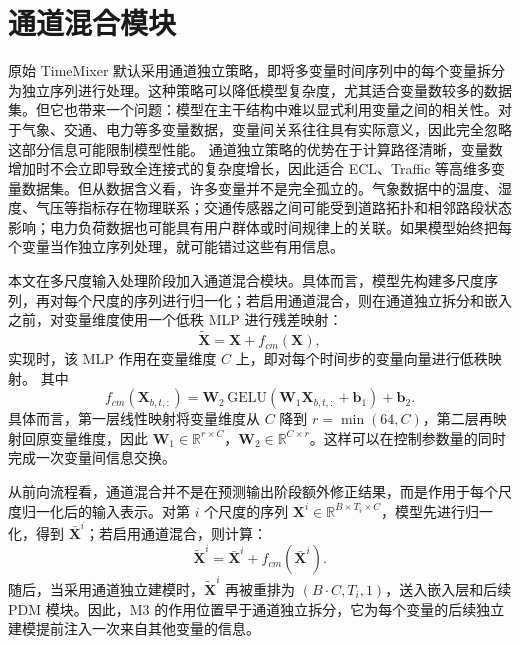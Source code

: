 \section{通道混合模块}

原始 TimeMixer 默认采用通道独立策略，即将多变量时间序列中的每个变量拆分为独立序列进行处理。这种策略可以降低模型复杂度，尤其适合变量数较多的数据集。但它也带来一个问题：模型在主干结构中难以显式利用变量之间的相关性。对于气象、交通、电力等多变量数据，变量间关系往往具有实际意义，因此完全忽略这部分信息可能限制模型性能。
通道独立策略的优势在于计算路径清晰，变量数增加时不会立即导致全连接式的复杂度增长，因此适合 ECL、Traffic 等高维多变量数据集。但从数据含义看，许多变量并不是完全孤立的。气象数据中的温度、湿度、气压等指标存在物理联系；交通传感器之间可能受到道路拓扑和相邻路段状态影响；电力负荷数据也可能具有用户群体或时间规律上的关联。如果模型始终把每个变量当作独立序列处理，就可能错过这些有用信息。

本文在多尺度输入处理阶段加入通道混合模块。具体而言，模型先构建多尺度序列，再对每个尺度的序列进行归一化；若启用通道混合，则在通道独立拆分和嵌入之前，对变量维度使用一个低秩 MLP 进行残差映射：
\begin{equation}
    \tilde{\mathbf{X}} = \mathbf{X} + f_{cm}(\mathbf{X}),
\end{equation}
实现时，该 MLP 作用在变量维度 $C$ 上，即对每个时间步的变量向量进行低秩映射。
其中
\begin{equation}
    f_{cm}(\mathbf{X}_{b,t,:}) = \mathbf{W}_2 \,\mathrm{GELU}(\mathbf{W}_1 \mathbf{X}_{b,t,:}+\mathbf{b}_1)+\mathbf{b}_2.
\end{equation}
具体而言，第一层线性映射将变量维度从 $C$ 降到 $r=\min(64,C)$，第二层再映射回原变量维度，因此 $\mathbf{W}_1\in\mathbb{R}^{r\times C}$，$\mathbf{W}_2\in\mathbb{R}^{C\times r}$。这样可以在控制参数量的同时完成一次变量间信息交换。

从前向流程看，通道混合并不是在预测输出阶段额外修正结果，而是作用于每个尺度归一化后的输入表示。对第 $i$ 个尺度的序列 $\mathbf{X}^{i}\in\mathbb{R}^{B\times T_i\times C}$，模型先进行归一化，得到 $\bar{\mathbf{X}}^{i}$；若启用通道混合，则计算：
\begin{equation}
    \tilde{\mathbf{X}}^{i}=\bar{\mathbf{X}}^{i}+f_{cm}(\bar{\mathbf{X}}^{i}).
\end{equation}
随后，当采用通道独立建模时，$\tilde{\mathbf{X}}^{i}$ 再被重排为 $(B\cdot C,T_i,1)$，送入嵌入层和后续 PDM 模块。因此，M3 的作用位置早于通道独立拆分，它为每个变量的后续独立建模提前注入一次来自其他变量的信息。

